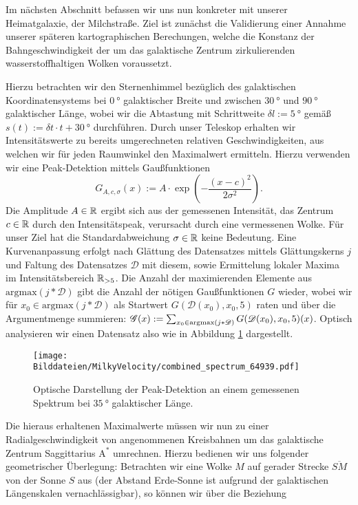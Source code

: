 \documentclass[../../main.tex]{subfiles}
\begin{document}
    Im nächsten Abschnitt befassen wir uns nun konkreter mit unserer Heimatgalaxie, der Milchstraße. Ziel ist zunächst die Validierung einer Annahme unserer späteren kartographischen Berechungen, welche die Konstanz der Bahngeschwindigkeit der um das galaktische Zentrum zirkulierenden wasserstoffhaltigen Wolken voraussetzt. 
    
    Hierzu betrachten wir den Sternenhimmel bezüglich des galaktischen Koordinatensystems bei $\SI{0}{\degree}$ galaktischer Breite und zwischen $\SI{30}{\degree}$ und $\SI{90}{\degree}$ galaktischer Länge, wobei wir die Abtastung mit Schrittweite $\delta l := \SI{5}{\degree}$ gemäß $s(t) := \delta t\cdot t + \SI{30}{\degree}$ durchführen. Durch unser Teleskop erhalten wir Intensitätswerte zu bereits umgerechneten relativen Geschwindigkeiten, aus welchen wir für jeden Raumwinkel den Maximalwert ermitteln. Hierzu verwenden wir eine Peak-Detektion mittels Gaußfunktionen
    \[
        G_{A,c,\sigma}(x) := A\cdot\exp(-\frac{(x-c)^2}{2\sigma^2}).
    \] 
    Die Amplitude $A\in\mathbb{R}$ ergibt sich aus der gemessenen Intensität, das Zentrum $c\in\mathbb{R}$ durch den Intensitätspeak, verursacht durch eine vermessenen Wolke. Für unser Ziel hat die Standardabweichung $\sigma\in\mathbb{R}$ keine Bedeutung. Eine Kurvenanpassung erfolgt nach Glättung des Datensatzes mittels Glättungskerns $j$ und Faltung des Datensatzes $\mathcal{D}$ mit diesem, sowie Ermittelung lokaler Maxima im Intensitätsbereich $\mathbb{R}_{>5}$. Die Anzahl der maximierenden Elemente aus $\text{argmax}(j\ast\mathcal{D})$ gibt die Anzahl der nötigen Gaußfunktionen $G$ wieder, wobei wir für $x_0\in\text{argmax}(j\ast\mathcal{D})$ als Startwert $G(\mathcal{D}(x_0),x_0,5)$ raten und über die Argumentmenge summieren: $\mathcal G(x) := \sum_{x_0\in\text{argmax}(j\ast\mathcal{D})}G(\mathcal{D}(x_0),x_0,5)(x)$. Optisch analysieren wir einen Datensatz also wie in Abbildung \ref{fig:combined_spectrum_64939} dargestellt. 
    \begin{figure}[H]
        \centering
        \texttt{[image: Bilddateien/MilkyVelocity/combined\_spectrum\_64939.pdf]}
        \caption{Optische Darstellung der Peak-Detektion an einem gemessenen Spektrum bei $\SI{35}{\degree}$ galaktischer Länge.}
        \label{fig:combined_spectrum_64939}
    \end{figure} 
    Die hieraus erhaltenen Maximalwerte müssen wir nun zu einer Radialgeschwindigkeit von angenommenen Kreisbahnen um das galaktische Zentrum Saggittarius $\text{A}^*$ umrechnen. Hierzu bedienen wir uns folgender geometrischer Überlegung: Betrachten wir eine Wolke $M$ auf gerader Strecke $\overline{SM}$ von der Sonne $S$ aus (der Abstand Erde-Sonne ist aufgrund der galaktischen Längenskalen vernachlässigbar), so können wir über die Beziehung 
\end{document}
